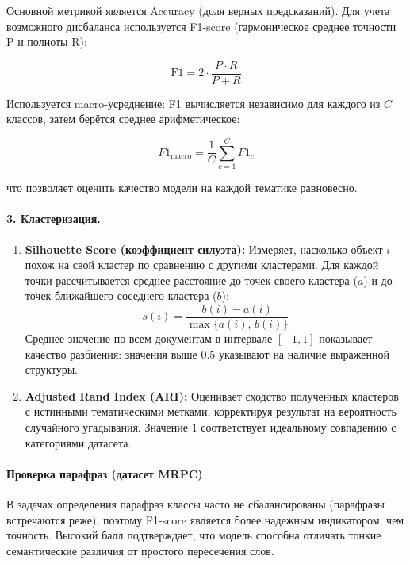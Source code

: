 Основной метрикой является Accuracy (доля
верных предсказаний). Для учета возможного дисбаланса используется
F1-score (гармоническое среднее точности P и полноты R):

\begin{displaymath}
  \text{F1} = 2 \cdot \frac{P \cdot R }{P + R}
\end{displaymath}

Используется macro-усреднение: F1 вычисляется независимо для каждого
из \(C\) классов, затем берётся среднее арифметическое:

\begin{displaymath}
  F1_{\text{macro}} = \frac{1}{C}\sum_{c=1}^{C} F1_c
\end{displaymath}

что позволяет оценить качество модели на каждой тематике равновесно.

\paragraph{3. Кластеризация.}

\begin{enumerate}
  \item \textbf{Silhouette Score (коэффициент силуэта):} Измеряет,
    насколько объект \(i\) похож на свой кластер по сравнению с другими
    кластерами. Для каждой точки рассчитывается среднее расстояние до
    точек своего кластера (\(a\)) и до точек ближайшего соседнего
    кластера (\(b\)):
    \[
      s(i) = \frac{b(i) - a(i)}{\max\{a(i),\, b(i)\}}
    \]
    Среднее значение по всем документам в интервале \([-1, 1]\) показывает
    качество разбиения: значения выше 0.5 указывают на наличие выраженной
    структуры.

  \item \textbf{Adjusted Rand Index (ARI):} Оценивает сходство
    полученных кластеров с истинными тематическими метками, корректируя
    результат на вероятность случайного угадывания. Значение 1
    соответствует идеальному совпадению с категориями датасета.
\end{enumerate}

\paragraph{Проверка парафраз (датасет MRPC)}
В задачах определения парафраз классы часто не сбалансированы (парафразы
встречаются реже), поэтому F1-score является более надежным
индикатором, чем точность. Высокий балл подтверждает, что модель
способна отличать тонкие семантические различия от простого пересечения слов.

